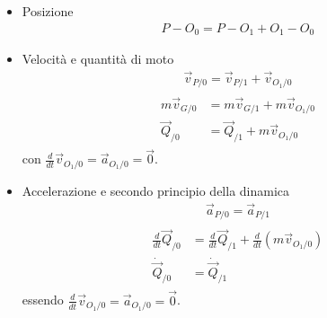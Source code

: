 \documentclass[letterpaper,10pt,italian]{jupyterBook}
\begin{document}
\sphinxAtStartPar
{} 

\sphinxAtStartPar
{}
\begin{itemize}
\item {} 
\sphinxAtStartPar
Posizione
\begin{equation*}
\begin{split}P - O_0 = P - O_1 + O_1 - O_0\end{split}
\end{equation*}
\item {} 
\sphinxAtStartPar
Velocità e quantità di moto
\begin{equation*}
\begin{split}\vec{v}_{P/0} = \vec{v}_{P/1} + \vec{v}_{O_1/0}\end{split}
\end{equation*}\begin{equation*}
\begin{split}\begin{aligned}
    m \vec{v}_{G/0} & = m \vec{v}_{G/1} + m \vec{v}_{O_1/0} \\
       \vec{Q}_{/0} & = \vec{Q}_{/1} + m \vec{v}_{O_1/0}
  \end{aligned}\end{split}
\end{equation*}
\sphinxAtStartPar
con \(\frac{d}{dt} \vec{v}_{O_1/0} = \vec{a}_{O_1/0} = \vec{0}\).

\item {} 
\sphinxAtStartPar
Accelerazione e secondo principio della dinamica
\begin{equation*}
\begin{split}\vec{a}_{P/0} = \vec{a}_{P/1}\end{split}
\end{equation*}\begin{equation*}
\begin{split}\begin{aligned}
    \frac{d}{dt} \vec{Q}_{/0} & = \frac{d}{dt} \vec{Q}_{/1} + \frac{d}{dt} \left( m \vec{v}_{O_1/0}\right) \\
    \dot{\vec{Q}}_{/0} & = \dot{\vec{Q}}_{/1}
  \end{aligned}\end{split}
\end{equation*}
\sphinxAtStartPar
essendo \(\frac{d}{dt} \vec{v}_{O_1/0} = \vec{a}_{O_1/0} = \vec{0}\).

\end{itemize}
\end{document}
